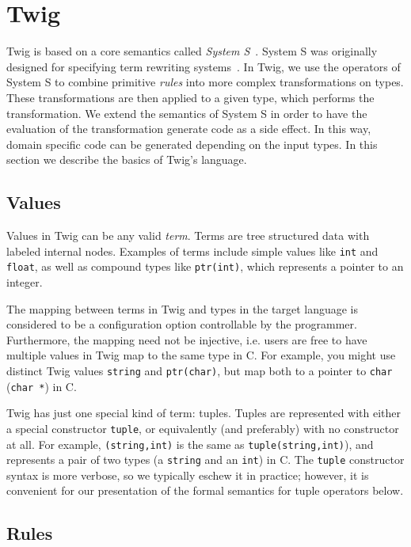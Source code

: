 
\section{Twig}
\label{sec:semantics}

Twig is based on a core semantics called \emph{System S}~\cite{system-s}. System
S was originally designed for specifying term rewriting
systems~\cite{baader98rewriting}. In Twig, we use the operators of System S to
combine primitive \emph{rules} into more complex transformations on types. These
transformations are then applied to a given type, which performs the
transformation. We extend the semantics of System S in order to have the
evaluation of the transformation generate code as a side effect. In this way,
domain specific code can be generated depending on the input types. In this
section we describe the basics of Twig's language.

\subsection{Values}

Values in Twig can be any valid \emph{term}. Terms are tree structured data with
labeled internal nodes. Examples of terms include simple values like
\texttt{int} and \texttt{float}, as well as compound types like
\texttt{ptr(int)}, which represents a pointer to an integer.

The mapping between terms in Twig and types in the target language is considered
to be a configuration option controllable by the programmer. Furthermore, the
mapping need not be injective, i.e. users are free to have multiple values in
Twig map to the same type in C. For example, you might use distinct Twig values
\texttt{string} and \texttt{ptr(char)}, but map both to a pointer to
\texttt{char} (\texttt{char *}) in C.

Twig has just one special kind of term: tuples. Tuples are represented with
either a special constructor \texttt{tuple}, or equivalently (and preferably)
with no constructor at all. For example, \texttt{(string,int)} is the same as
\texttt{tuple(string,int)}), and represents a pair of two types (a
\texttt{string} and an \texttt{int}) in C. The \texttt{tuple} constructor syntax
is more verbose, so we typically eschew it in practice; however, it is
convenient for our presentation of the formal semantics for tuple operators
below.

\subsection{Rules}

